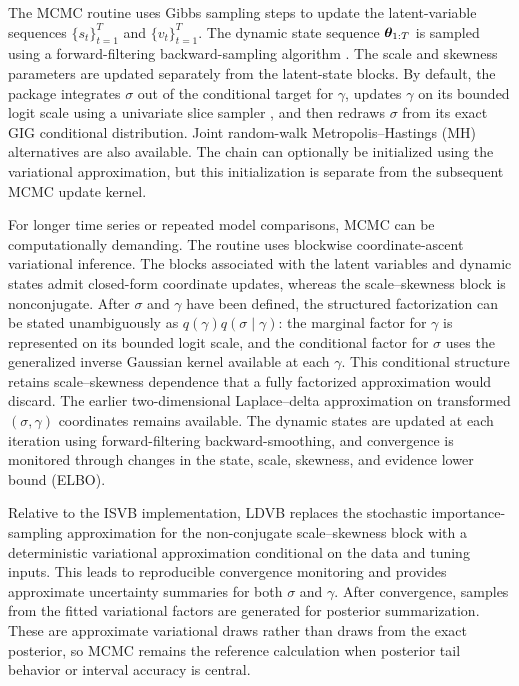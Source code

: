 The MCMC routine uses Gibbs sampling steps to update the latent-variable sequences
$\{s_t\}_{t=1}^T$ and $\{v_t\}_{t=1}^T$. The dynamic state sequence $\boldsymbol{\theta}_{1:T}$ is sampled using a forward-filtering backward-sampling algorithm \citep{exd-carter1994gibbs,exd-fruhwirth1994data}.
The scale and skewness parameters are updated separately from the latent-state blocks. By default, the package integrates $\sigma$ out of the conditional target for $\gamma$, updates $\gamma$ on its bounded logit scale using a univariate slice sampler \citep{exd-neal2003slice}, and then redraws $\sigma$ from its exact GIG conditional distribution. Joint
random-walk Metropolis--Hastings (MH) alternatives are also available.
The chain can optionally be initialized using the variational
approximation, but this initialization is separate from the subsequent MCMC
update kernel.


For longer time series or repeated model comparisons, MCMC can be computationally demanding. The  routine uses blockwise coordinate-ascent variational inference. The blocks associated with the latent variables and dynamic states admit closed-form coordinate updates, whereas the scale--skewness block is nonconjugate. After \(\sigma\) and \(\gamma\) have been defined, the structured factorization can be stated unambiguously as \(q(\gamma)q(\sigma\mid\gamma)\): the marginal factor for \(\gamma\) is represented on its bounded logit scale, and the conditional factor for \(\sigma\) uses the generalized inverse Gaussian kernel available at each \(\gamma\). This conditional structure retains scale--skewness dependence that a fully factorized approximation would discard. The earlier two-dimensional Laplace--delta approximation on transformed \((\sigma,\gamma)\) coordinates remains available. The dynamic states are updated at each iteration using forward-filtering backward-smoothing, and convergence is monitored through changes in the state, scale, skewness, and evidence lower bound (ELBO).

Relative to the ISVB implementation, LDVB replaces the stochastic importance-sampling approximation for the non-conjugate scale--skewness block with a deterministic variational approximation conditional on the data and tuning inputs. This leads to reproducible convergence monitoring and provides approximate uncertainty summaries for both $\sigma$ and $\gamma$. After convergence, samples from the fitted variational factors are generated for posterior summarization. These are approximate variational draws rather than draws from the exact posterior, so MCMC remains the reference calculation when posterior tail behavior or interval accuracy is central.

